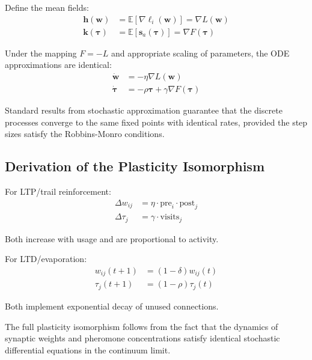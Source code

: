 \documentclass[12pt,letterpaper]{article}
\begin{document}
Define the mean fields:
\begin{align}
\mathbf{h}(\mathbf{w}) &= \mathbb{E}[\nabla \ell_i(\mathbf{w})] = \nabla L(\mathbf{w}) \label{eq:mean_field1}\\
\mathbf{k}(\boldsymbol{\tau}) &= \mathbb{E}[\mathbf{s}_a(\boldsymbol{\tau})] = \nabla F(\boldsymbol{\tau}) \label{eq:mean_field2}
\end{align}

Under the mapping $F = -L$ and appropriate scaling of parameters, the ODE approximations are identical:
\begin{align}
\dot{\mathbf{w}} &= -\eta \nabla L(\mathbf{w}) \label{eq:ode1}\\
\dot{\boldsymbol{\tau}} &= -\rho \boldsymbol{\tau} + \gamma \nabla F(\boldsymbol{\tau}) \label{eq:ode2}
\end{align}

Standard results from stochastic approximation guarantee that the discrete processes converge to the same fixed points with identical rates, provided the step sizes satisfy the Robbins-Monro conditions.

\subsection{Derivation of the Plasticity Isomorphism}

For LTP/trail reinforcement:
\begin{align}
\Delta w_{ij} &= \eta \cdot \text{pre}_i \cdot \text{post}_j \label{eq:ltp_eq}\\
\Delta \tau_j &= \gamma \cdot \text{visits}_j \label{eq:reinforcement_eq}
\end{align}

Both increase with usage and are proportional to activity.

For LTD/evaporation:
\begin{align}
w_{ij}(t+1) &= (1-\delta)w_{ij}(t) \label{eq:ltd_eq}\\
\tau_j(t+1) &= (1-\rho)\tau_j(t) \label{eq:evaporation_eq}
\end{align}

Both implement exponential decay of unused connections.

The full plasticity isomorphism follows from the fact that the dynamics of synaptic weights and pheromone concentrations satisfy identical stochastic differential equations in the continuum limit.



\end{document}
